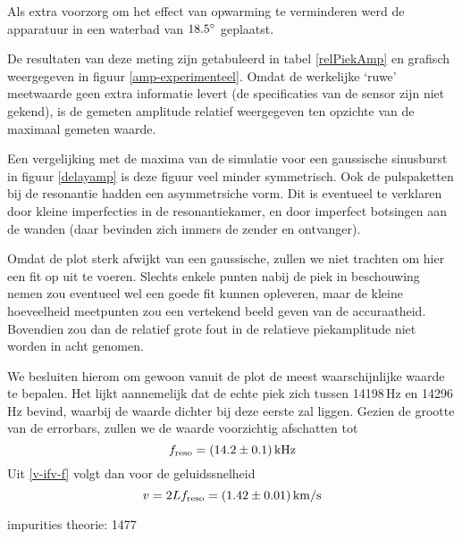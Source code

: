 Als extra voorzorg om het effect van opwarming te verminderen werd de 
apparatuur in een waterbad van $18.5^\circ$ geplaatst.

De resultaten van deze meting zijn getabuleerd in tabel \ref{relPiekAmp} en 
grafisch weergegeven in figuur \ref{amp-experimenteel}. Omdat de werkelijke 
`ruwe' meetwaarde geen extra informatie levert (de specificaties van de 
sensor zijn niet gekend), is de gemeten amplitude relatief weergegeven ten 
opzichte van de maximaal gemeten waarde.

\relPiekAmp
{}

Een vergelijking met de maxima van de simulatie voor een gaussische 
sinusburst in figuur \ref{delayamp} is deze figuur veel minder symmetrisch.  
Ook de pulspaketten bij de resonantie hadden een asymmetrsiche vorm. Dit is 
eventueel te verklaren door kleine imperfecties in de resonantiekamer, en 
door imperfect botsingen aan de wanden (daar bevinden zich immers de zender 
en ontvanger).

Omdat de plot sterk afwijkt van een gaussische, zullen we niet trachten om 
hier een fit op uit te voeren. Slechts enkele punten nabij de piek in 
beschouwing nemen zou eventueel wel een goede fit kunnen opleveren, maar de 
kleine hoeveelheid meetpunten zou een vertekend beeld geven van de 
accuraatheid. Bovendien zou dan de relatief grote fout in de relatieve 
piekamplitude niet worden in acht genomen.

We besluiten hierom om gewoon vanuit de plot de meest waarschijnlijke 
waarde te bepalen. Het lijkt aannemelijk dat de echte piek zich tussen
14198\,Hz en 14296\,Hz bevind, waarbij de waarde dichter bij deze eerste 
zal liggen. Gezien de grootte van de errorbars, zullen we de waarde 
voorzichtig afschatten tot
$$
f_\mathrm{reso} = (14.2 \pm 0.1)\,\rm kHz
$$
Uit \ref{v-ifv-f} volgt dan voor de geluidssnelheid
$$
v = 2Lf_\mathrm{reso}
= (1.42 \pm 0.01)\,\rm km/s
$$





impurities
theorie: 1477 



